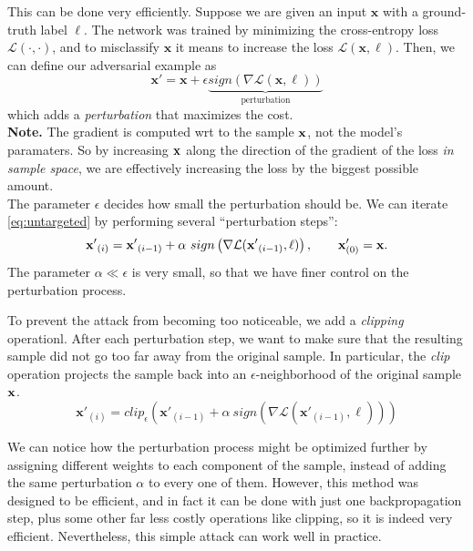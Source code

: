 This can be done very efficiently. Suppose we are given an input $\mathbf{x}$ with a ground-truth label $\ell$. The network was trained by minimizing the cross-entropy loss $\mathcal{L}(\cdot, \cdot)$, and to misclassify $\mathbf{x}$ it means to increase the loss $\mathcal{L}(\mathbf{x}, \ell)$. Then, we can define our adversarial example as
\begin{equation}\label{eq:untargeted}
	\mathbf{x'} = \mathbf{x} + \epsilon \underbrace{sign(\nabla \mathcal{L}(\mathbf{x}, \ell))}_{\text{perturbation}}
\end{equation}
which adds a \emph{perturbation} that maximizes the cost.
\\

\textbf{Note.} The gradient is computed wrt to the sample $\vb{x}$, not the model's paramaters. So by increasing $\vb{x}$ along the direction of the gradient of the loss \emph{in sample space}, we are effectively increasing the loss by the biggest possible amount.
\\

The parameter $\epsilon$ decides how small the perturbation should be. We can iterate \cref{eq:untargeted} by performing several ``perturbation steps'':
\begin{equation}
	\mathbf{x'}_{(i)} = \mathbf{x'}_{(i-1)} + \alpha \ sign\left( \nabla \mathcal{L}(\mathbf{x'}_{(i-1)}, \ell) \right), \qquad \vb{x}'_{(0)} = \vb{x}.
\end{equation}
The parameter $\alpha \ll \epsilon$ is very small, so that we have finer control on the perturbation process. 

To prevent the attack from becoming too noticeable, we add a \emph{clipping} operationl. After each perturbation step, we want to make sure that the resulting sample did not go too far away from the original sample. In particular, the \emph{clip} operation projects the sample back into an $\epsilon$-neighborhood of the original sample $\vb{x}$.
\begin{equation}
	\mathbf{x'}_{(i)} = clip_{\epsilon} \left(\mathbf{x'}_{(i-1)} + \alpha \ sign\left( \nabla \mathcal{L}(\mathbf{x'}_{(i-1)}, \ell) \right)\right)
\end{equation}

We can notice how the perturbation process might be optimized further by assigning different weights to each component of the sample, instead of adding the same perturbation $\alpha$ to every one of them. However, this method was designed to be efficient, and in fact it can be done with just one backpropagation step, plus some other far less costly operations like clipping, so it is indeed very efficient. Nevertheless, this simple attack can work well in practice.


